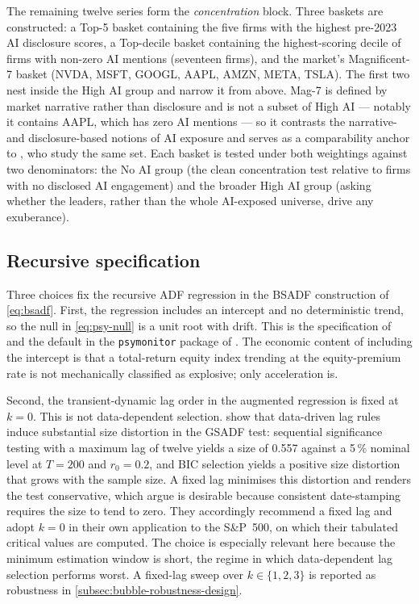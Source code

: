 The remaining twelve series form the \emph{concentration} block. Three
baskets are constructed: a Top-5 basket containing the five firms with
the highest pre-2023 AI disclosure scores, a Top-decile basket
containing the highest-scoring decile of firms with non-zero AI
mentions (seventeen firms), and the market's Magnificent-7 basket
(NVDA, MSFT, GOOGL, AAPL, AMZN, META, TSLA). The first two nest inside
the High AI group and narrow it from above. Mag-7 is defined by market
narrative rather than disclosure and is not a subset of High AI ---
notably it contains AAPL, which has zero AI mentions --- so it
contrasts the narrative- and disclosure-based notions of AI exposure
and serves as a comparability anchor to \citet{baselePhillipsShi2025},
who study the same set. Each basket is tested under both weightings
against two denominators: the No AI group (the clean concentration
test relative to firms with no disclosed AI engagement) and the
broader High AI group (asking whether the leaders, rather than the
whole AI-exposed universe, drive any exuberance).
 
 
\subsection{Recursive specification}
\label{subsec:bubble-specification}
 
Three choices fix the recursive ADF regression in the BSADF
construction of \cref{eq:bsadf}. First, the regression includes an
intercept and no deterministic trend, so the null in \cref{eq:psy-null}
is a unit root with drift. This is the specification of
\citet{phillipsWuYu2011, phillipsShiYu2014, phillipsShiYu2015a} and
the default in the \texttt{psymonitor} package of
\citet{caspiPhillipsShi2018}. The economic content of including the
intercept is that a total-return equity index trending at the
equity-premium rate is not mechanically classified as explosive; only
acceleration is.
 
Second, the transient-dynamic lag order in the augmented regression
is fixed at $k = 0$. This is not data-dependent selection.
\citet[Section~4.1, Table~2]{phillipsShiYu2015a} show that data-driven
lag rules induce substantial size distortion in the GSADF test:
sequential significance testing with a maximum lag of twelve yields a
size of \num{0.557} against a 5\,\% nominal level at $T = 200$ and
$r_0 = 0.2$, and BIC selection yields a positive size distortion that
grows with the sample size. A fixed lag minimises this distortion and
renders the test conservative, which \citet{phillipsShiYu2015a} argue
is desirable because consistent date-stamping requires the size to
tend to zero. They accordingly recommend a fixed lag and adopt
$k = 0$ in their own application to the S\&P~500, on which their
tabulated critical values are computed. The choice is especially
relevant here because the minimum estimation window is short, the
regime in which data-dependent lag selection performs worst. A
fixed-lag sweep over $k \in \{1, 2, 3\}$ is reported as robustness in
\cref{subsec:bubble-robustness-design}.
 
